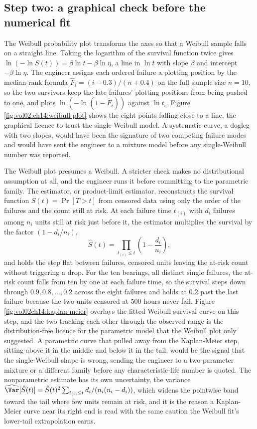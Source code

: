 \subsection{Step two: a graphical check before the numerical fit}

The Weibull probability plot transforms the axes so that a Weibull
sample falls on a straight line. Taking the logarithm of the survival
function twice gives $\ln(-\ln S(t)) = \beta\ln t - \beta\ln\eta$, a
line in $\ln t$ with slope $\beta$ and intercept $-\beta\ln\eta$. The
engineer assigns each ordered failure a plotting position by the
median-rank formula $\hat{F}_{i} = (i - 0.3)/(n + 0.4)$ on the full
sample size $n = 10$, so the two survivors keep the late failures'
plotting positions from being pushed to one, and plots
$\ln(-\ln(1 - \hat{F}_{i}))$ against
$\ln t_{i}$. Figure \ref{fig:vol02:ch14:weibull-plot} shows the eight
points falling close to a line, the graphical licence to trust the
single-Weibull model. A systematic curve, a dogleg with two slopes,
would have been the signature of two competing failure modes and would
have sent the engineer to a mixture model before any single-Weibull
number was reported.



The Weibull plot presumes a Weibull. A stricter check makes no
distributional assumption at all, and the engineer runs it before
committing to the parametric family. The 
estimator, or product-limit estimator, reconstructs the survival
function $S(t) = \Pr[T > t]$ from censored data using only the order of
the failures and the count still at risk. At each failure time $t_{(i)}$
with $d_{i}$ failures among $n_{i}$ units still at risk just before it,
the estimator multiplies the survival by the factor $(1 - d_{i}/n_{i})$,
\[
\hat{S}(t) = \prod_{t_{(i)} \leq t}\left(1 - \frac{d_{i}}{n_{i}}\right),
\]
and holds the step flat between failures, censored units leaving the
at-risk count without triggering a drop. For the ten bearings, all
distinct single failures, the at-risk count falls from ten by one at
each failure time, so the survival steps down through $0.9, 0.8, \ldots,
0.2$ across the eight failures and holds at $0.2$ past the last failure
because the two units censored at $500$ hours never fail. Figure
\ref{fig:vol02ch14:kaplan-meier} overlays the fitted Weibull survival
curve on this step, and the two tracking each other through the
observed range is the distribution-free licence for the parametric
model that the Weibull plot only suggested. A parametric curve that
pulled away from the Kaplan-Meier step, sitting above it in the middle
and below it in the tail, would be the signal that the single-Weibull
shape is wrong, sending the engineer to a two-parameter mixture or a
different family before any characteristic-life number is quoted. The
nonparametric estimate has its own uncertainty, the
 variance $\widehat{\Var}[\hat{S}(t)] = \hat{S}(t)^{2}
\sum_{t_{(i)} \leq t} d_{i}/(n_{i}(n_{i} - d_{i}))$, which widens the
pointwise band toward the tail where few units remain at risk, and it is
the reason a Kaplan-Meier curve near its right end is read with the same
caution the Weibull fit's lower-tail extrapolation earns.

